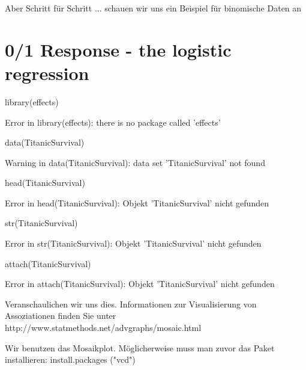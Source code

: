 \documentclass[a4paper,twoside]{tufte-book}\usepackage[]{graphicx}\usepackage[]{color}
\begin{document}
\begin{appendices}
Aber Schritt für Schritt ... schauen wir uns ein Beispiel für binomische Daten an


\section{0/1 Response - the logistic regression}

\begin{Schunk}
\begin{Sinput}
library(effects) 
\end{Sinput}
\begin{Soutput}
Error in library(effects): there is no package called 'effects'
\end{Soutput}
\begin{Sinput}
data(TitanicSurvival)
\end{Sinput}
\begin{Soutput}
Warning in data(TitanicSurvival): data set 'TitanicSurvival' not found
\end{Soutput}
\begin{Sinput}
head(TitanicSurvival)
\end{Sinput}
\begin{Soutput}
Error in head(TitanicSurvival): Objekt 'TitanicSurvival' nicht gefunden
\end{Soutput}
\begin{Sinput}
str(TitanicSurvival)
\end{Sinput}
\begin{Soutput}
Error in str(TitanicSurvival): Objekt 'TitanicSurvival' nicht gefunden
\end{Soutput}
\begin{Sinput}
attach(TitanicSurvival)
\end{Sinput}
\begin{Soutput}
Error in attach(TitanicSurvival): Objekt 'TitanicSurvival' nicht gefunden
\end{Soutput}
\end{Schunk}

Veranschaulichen wir uns dies. Informationen zur Visualisierung von Assoziationen finden Sie unter http://www.statmethods.net/advgraphs/mosaic.html

Wir benutzen das Mosaikplot. Möglicherweise muss man zuvor das Paket installieren: install.packages ("vcd")


\end{appendices}
\end{document}
